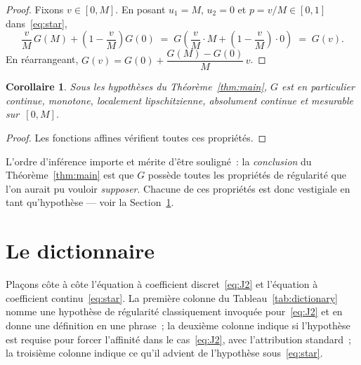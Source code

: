 \documentclass[11pt,a4paper]{amsart}
\newtheorem{corollary}[theorem]{Corollaire}
\begin{document}
\begin{proof}
Fixons $v \in [0, M]$. En posant $u_1 = M$, $u_2 = 0$ et $p = v/M \in [0, 1]$
dans~\eqref{eq:star},
\[
\frac{v}{M}\,G(M) + \left(1 - \frac{v}{M}\right) G(0) \;=\;
G\!\left(\frac{v}{M} \cdot M + \left(1 - \frac{v}{M}\right) \cdot 0\right)
\;=\; G(v).
\]
En réarrangeant, $G(v) = G(0) + \dfrac{G(M) - G(0)}{M}\,v$.
\end{proof}

\begin{corollary}
\label{cor:regularity}
Sous les hypothèses du Théorème~\ref{thm:main}, $G$ est en particulier
continue, monotone, localement lipschitzienne, absolument continue et
mesurable sur~$[0, M]$.
\end{corollary}

\begin{proof}
Les fonctions affines vérifient toutes ces propriétés.
\end{proof}

L'ordre d'inférence importe et mérite d'être souligné~: la \emph{conclusion}
du Théorème~\ref{thm:main} est que $G$ possède toutes les propriétés de
régularité que l'on aurait pu vouloir \emph{supposer}. Chacune de ces
propriétés est donc vestigiale en tant qu'hypothèse --- voir la
Section~\ref{sec:dictionary}.

\section{Le dictionnaire}
\label{sec:dictionary}

Plaçons côte à côte l'équation à coefficient discret~\eqref{eq:J2} et
l'équation à coefficient continu~\eqref{eq:star}. La première colonne du
Tableau~\ref{tab:dictionary} nomme une hypothèse de régularité
classiquement invoquée pour~\eqref{eq:J2} et en donne une définition en
une phrase~; la deuxième colonne indique si l'hypothèse est requise pour
forcer l'affinité dans le cas~\eqref{eq:J2}, avec l'attribution standard~;
la troisième colonne indique ce qu'il advient de l'hypothèse
sous~\eqref{eq:star}.
\end{document}
